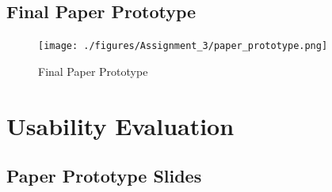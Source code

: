 \documentclass[acmsmall,screen,authorversion,nonacm]{acmart}
\begin{document}
\subsection{Final Paper Prototype}

\begin{figure}[H]
\begin{center}
\texttt{[image: ./figures/Assignment\_3/paper\_prototype.png]}
\caption{Final Paper Prototype}
\label{fig:final_paper_prototype}
\Description{}
\end{center}
\end{figure}

\section{Usability Evaluation}

\subsection{Paper Prototype Slides}
\label{appendix:paper_prototype_slides}
\end{document}
